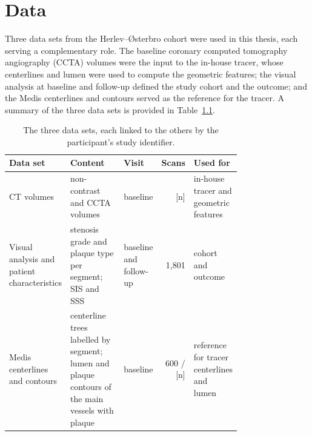 \providecommand{\clarify}[1]{\textcolor{red}{\textbf{Clarification needed:} #1}}

\chapter{Data}
\label{ch:data}

Three data sets from the Herlev--{\O}sterbro cohort were used in this thesis, each serving a complementary role.
The baseline coronary computed tomography angiography (CCTA) volumes were the input to the in-house tracer, whose centerlines and lumen were used to compute the geometric features; the visual analysis at baseline and follow-up defined the study cohort and the outcome; and the Medis centerlines and contours served as the reference for the tracer.
A summary of the three data sets is provided in Table~\ref{tab:data-overview}.

\begin{table}[htbp]
  \centering
  \caption{The three data sets, each linked to the others by the participant's study identifier.}
  \label{tab:data-overview}
  \small
  \begin{tabular}{p{0.16\linewidth}p{0.3\linewidth}p{0.12\linewidth}rp{0.18\linewidth}}
    \toprule
    Data set & Content & Visit & Scans & Used for \\
    \midrule
    CT volumes & non-contrast and CCTA volumes & baseline & [n] & in-house tracer and geometric features \\
    Visual analysis and patient characteristics & stenosis grade and plaque type per segment; SIS and SSS & baseline and follow-up & 1,801 & cohort and outcome \\
    Medis centerlines and contours & centerline trees labelled by segment; lumen and plaque contours of the main vessels with plaque & baseline & 600 / [n] & reference for tracer centerlines and lumen \\
    \bottomrule
  \end{tabular}
\end{table}
